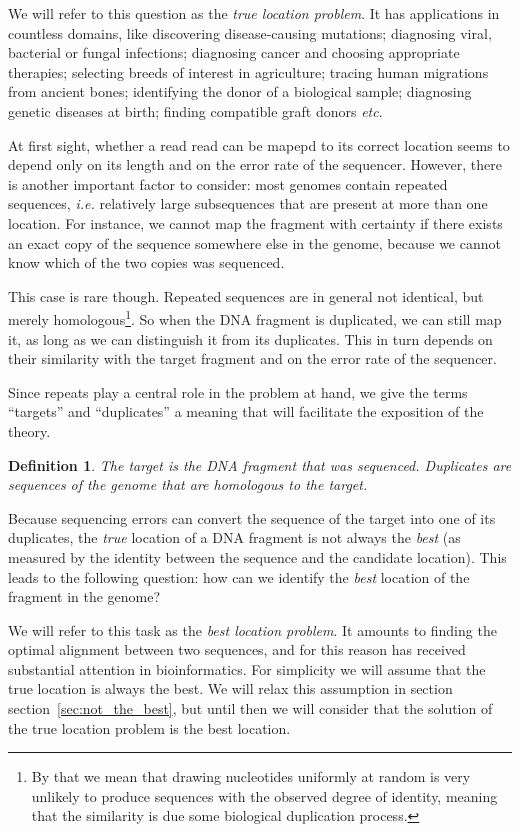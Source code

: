 \documentclass{article}
\newtheorem{definition}{Definition}
\begin{document}
We will refer to this question as the \emph{true location problem}.
It has applications in countless domains, like discovering
disease-causing mutations; diagnosing viral, bacterial or fungal
infections; diagnosing cancer and choosing appropriate therapies;
selecting breeds of interest in agriculture; tracing human migrations from
ancient bones; identifying the donor of a biological sample; diagnosing
genetic diseases at birth; finding compatible graft donors \textit{etc}.

At first sight, whether a read read can be mapepd to its correct location
seems to depend only on its length and on the error rate of the sequencer.
However, there is another important factor to consider: most genomes
contain repeated sequences, \textit{i.e.} relatively large subsequences
that are present at more than one location. For instance, we cannot map
the fragment with certainty if there exists an exact copy of the sequence
somewhere else in the genome, because we cannot know which of the two
copies was sequenced.

This case is rare though. Repeated sequences are in general not identical,
but merely homologous\footnote{By that we mean that drawing nucleotides
uniformly at random is very unlikely to produce sequences with the
observed degree of identity, meaning that the similarity is due some
biological duplication process.}. So when the DNA fragment is duplicated,
we can still map it, as long as we can distinguish it from its duplicates.
This in turn depends on their similarity with the target fragment and on
the error rate of the sequencer.

Since repeats play a central role in the problem at hand, we give the
terms ``targets'' and ``duplicates'' a meaning that will facilitate the
exposition of the theory.

\begin{definition}
The target is the DNA fragment that was sequenced. Duplicates are
sequences of the genome that are homologous to the target.
\end{definition}

Because sequencing errors can convert the sequence of the target into one
of its duplicates, the \emph{true} location of a DNA fragment is not
always the \emph{best} (as measured by the identity between the sequence
and the candidate location). This leads to the following question: how can
we identify the \emph{best} location of the fragment in the genome? 

We will refer to this task as the \emph{best location problem}. It amounts
to finding the optimal alignment between two sequences, and for this
reason has received substantial attention in bioinformatics. For
simplicity we will assume that the true location is always the best. We
will relax this assumption in section section~\ref{sec:not_the_best}, but
until then we will consider that the solution of the true location problem
is the best location.
\end{document}

